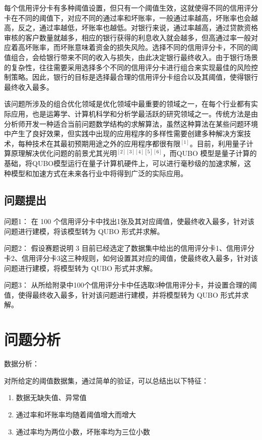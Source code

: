 \documentclass{MathorCupmodeling}
\begin{document}
  每个信用评分卡有多种阈值设置，但只有一个阈值生效，这就使得不同的信用评分卡在不同的阈值下，对应不同的通过率和坏账率，一般通过率越高，坏账率也会越高，反之，通过率越低，坏账率也越低。对银行来说，通过率越高，通过贷款资格审核的客户数量就越多，相应的银行获得的利息收入就会越多，但高通过率一般对应着高坏账率，而坏账意味着资金的损失风险。选择不同的信用评分卡，不同的阈值组合，会给银行带来不同的收入与损失，由此决定银行最终收入。由于银行场景的复杂性，往往需要采用选择多个不同的信用评分卡进行组合来实现最佳的风险控制策略。因此，银行的目标是选择最合理的信用评分卡组合以及其阈值，使得银行最终收入最多。
  
  该问题所涉及的组合优化领域是优化领域中最重要的领域之一，在每个行业都有实际应用，也是运筹学、计算机科学和分析学最活跃的研究领域之一。传统方法是由分析师开发一种适合当前问题数学结构的求解算法，虽然这种算法在某些问题环境中产生了良好效果，但实践中出现的应用程序的多样性需要创建多种解决方案技术，每种技术在其最初预期用途之外的应用程序都很有限$^{[1]}$。目前，利用量子计算原理解决优化问题的前景尤其光明$^{[2][3][4][5][6]}$，而QUBO 模型是量子计算的基础，将QUBO模型运行在量子计算机硬件上，可以进行毫秒级的加速求解，这种模型和加速方式在未来各行业中将得到广泛的实际应用。
 	\subsection{问题提出}
  问题1：
在 100 个信用评分卡中找出1张及其对应阈值，使最终收入最多，针对该问题进行建模，将该模型转为 QUBO 形式并求解。

问题2：
假设赛题说明 3 目前已经选定了数据集中给出的信用评分卡1、信用评分卡2、信用评分卡3这三种规则，如何设置其对应的阈值，使最终收入最多，针对该问题进行建模，将模型转为 QUBO 形式并求解。

问题3：
从所给附录中100个信用评分卡中任选取3种信用评分卡，并设置合理的阈值，使得最终收入最多，针对该问题进行建模，并将模型转为 QUBO 形式并求解。

	\section{问题分析}
 数据分析：
 
 对所给定的阈值数据集，通过简单的验证，可以总结出以下特征：
 \begin{enumerate}
     \item 数据无缺失值、异常值
     \item 通过率和坏账率均随着阈值增大而增大
     \item 通过率均为两位小数，坏账率均为三位小数
 \end{enumerate}
  
\end{document}
